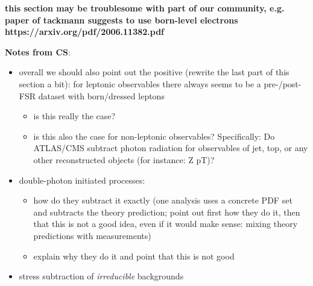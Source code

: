 {\bf this section may be troublesome with part of our community, e.g. paper of tackmann suggests to use born-level electrons https://arxiv.org/pdf/2006.11382.pdf}

\clearpage
\noindent
\textbf{Notes from CS}:
\begin{itemize}
\item overall we should also point out the positive (rewrite the last part of this section a bit): for leptonic observables there always seems to be a pre-/post-FSR dataset with born/dressed leptons
\begin{itemize}
\item is this really the case?
\item is this also the case for non-leptonic observables? Specifically: Do ATLAS/CMS subtract photon radiation for observables of jet, top, or any other reconstructed objects (for instance: Z pT)?
\end{itemize}
\item double-photon initiated processes:
\begin{itemize}
\item how do they subtract it exactly (one analysis uses a concrete PDF set and subtracts the theory prediction; point out first how they do it, then that this is not a good idea, even if it would make sense: mixing theory predictions with measurements)
\item explain why they do it and point that this is not good
\end{itemize}
\item stress subtraction of \emph{irreducible} backgrounds
\end{itemize}
